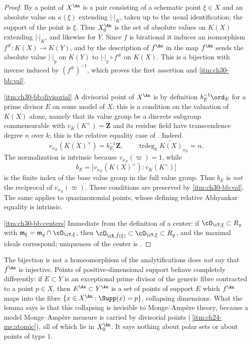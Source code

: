 \begin{proof}
By  a point of \(X^{\An}\) is a pair
consisting of a schematic point \(\xi\in X\) and an absolute value on
\(\kappa(\xi)\) extending \(|\cdot|_K\), taken up to the usual
identification; the support of the point is \(\xi\).  Thus \(X^{\An}_0\) is
the set of absolute values on \(K(X)\) extending \(|\cdot|_K\), and
likewise for \(Y\).  Since \(f\) is birational it induces an isomorphism
\(f^\#:K(X)\to K(Y)\), and by the description of \(f^{\An}\) in
 the map \(f^{\An}\) sends the absolute value
\(|\cdot|_y\) on \(K(Y)\) to \(|\cdot|_y\circ f^\#\) on \(K(X)\).  This is a
bijection with inverse induced by \((f^\#)^{-1}\), which proves the first
assertion and \cref{itm:ch30-bb:val}.

\cref{itm:ch30-bb:divisorial}  A divisorial point of \(X^{\An}\) is by
definition \(b_E^{-1}\ord_E\) for a prime divisor \(E\) on some model of
\(X\); this is a condition on the valuation of \(K(X)\) alone, namely that
its value group be a discrete subgroup commensurable with
\(v_K(K^\times)=\mathbf Z\) and its residue field have transcendence degree
\(n\) over \(k\); this is the relative equality case of
.  Indeed
\[
 v_{x_E}(K(X)^\times)=b_E^{-1}\mathbf Z,
 \qquad
 \operatorname{trdeg}_k\widetilde{K(X)}_{x_E}=n.
\]
The normalization is intrinsic because \(v_{x_E}(\varpi)=1\), while
\[
 b_E=
 \bigl[v_{x_E}(K(X)^\times):v_K(K^\times)\bigr]
\]
is the finite index of the base value group in the full value group.  Thus
\(b_E\) is \emph{not} the reciprocal of \(v_{x_E}(\varpi)\).  These
conditions are preserved by \cref{itm:ch30-bb:val}.  The same applies to
quasimonomial points, whose defining relative Abhyankar equality is
intrinsic.

\cref{itm:ch30-bb:centers}  Immediate from the definition of a center: if
\(\cO_{\cY,\xi}\subset R_y\) with \(\mathfrak m_\xi=\mathfrak m_y\cap
\cO_{\cY,\xi}\), then \(\cO_{\cX,\tilde f(\xi)}\subset\cO_{\cY,\xi}\subset
R_y\), and the maximal ideals correspond; uniqueness of the center is
.
\end{proof}

\begin{warning}{The bijection is not a homeomorphism of the analytifications}
 does \emph{not} say that \(f^{\An}\) is
injective.  Points of positive-dimensional support behave completely
differently: if \(E\subset Y\) is an exceptional prime divisor of the
generic fibre contracted to a point \(p\in X\), then \(E^{\An}\subset
Y^{\An}\) is a set of points of support \(E\) which \(f^{\An}\) maps into
the fibre \(\{x\in X^{\An}:\Supp(x)=p\}\), collapsing dimensions.  What the
lemma says is that this collapsing is invisible to Monge--Amp\`ere theory,
because a model Monge--Amp\`ere measure is carried by divisorial points
(\,\cref{itm:ch24-ms:atomic}), all of which lie
in \(X^{\An}_0\).  It says nothing about polar sets or about points of type
\(1\).
\end{warning}

